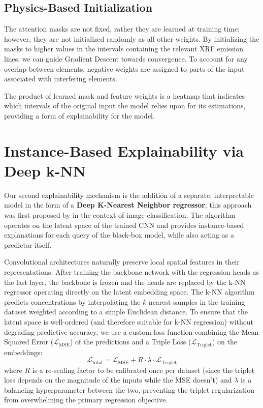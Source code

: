\documentclass[11pt,twoside]{article}
\begin{document}
\subsection{Physics-Based Initialization}
The attention masks are not fixed, rather they are learned at training time; however, they are not initialized randomly as all other weights. 
By initializing the masks to higher values in the intervals containing the relevant XRF emission lines, we can guide Gradient Descent towards convergence. To account for any overlap between elements, negative weights are assigned to parts of the input associated with interfering elements. 

The product of learned mask and feature weights is a heatmap that indicates which intervals of the original input the model relies upon for its estimations, providing a form of explainability for the model.

\section{Instance-Based Explainability via Deep k-NN}
Our second explainability mechanism is the addition of a separate, interpretable model in the form of a \textbf{Deep K-Nearest Neighbor regressor}; this approach was first proposed by \citet{DeepKNN} in the context of image classification. The algorithm operates on the latent space of the trained CNN and provides instance-based explanations for each query of the black-box model, while also acting as a predictor itself.

Convolutional architectures naturally preserve local spatial features in their representations. After training the backbone network with the regression heads as the last layer, the backbone is frozen and the heads are replaced by the k-NN regressor operating directly on the latent embedding space. The k-NN algorithm predicts concentrations by interpolating the $k$ nearest samples in the training dataset weighted according to a simple Euclidean distance.
To ensure that the latent space is well-ordered (and therefore suitable for k-NN regression) without degrading predictive accuracy, we use a custom loss function combining the Mean Squared Error ($\mathcal{L}_{\text{MSE}}$) of the predictions and a Triple Loss ($\mathcal{L}_{\text{Triplet}}$) on the embeddings:
\begin{equation}
    \mathcal{L}_{\text{total}} = \mathcal{L}_{\text{MSE}} + R \cdot \lambda \cdot \mathcal{L}_{\text{Triplet}}
\end{equation}
where $R$ is a re-scaling factor to be calibrated once per dataset (since the triplet loss depends on the magnitude of the inputs while the MSE doesn't) and $\lambda$ is a balancing hyperparameter between the two, preventing the triplet regularization from overwhelming the primary regression objective.
\end{document}
